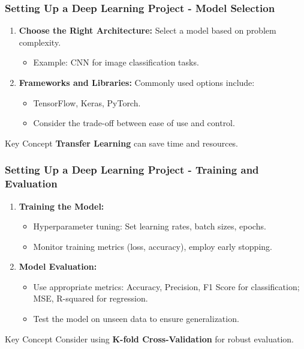 \documentclass[aspectratio=169]{beamer}
\begin{document}
\begin{frame}[fragile]
    \frametitle{Setting Up a Deep Learning Project - Model Selection}
    \begin{enumerate}
        \item \textbf{Choose the Right Architecture:} Select a model based on problem complexity.
            \begin{itemize}
                \item Example: CNN for image classification tasks.
            \end{itemize}
        \item \textbf{Frameworks and Libraries:} Commonly used options include:
            \begin{itemize}
                \item TensorFlow, Keras, PyTorch.
                \item Consider the trade-off between ease of use and control.
            \end{itemize}
    \end{enumerate}
    \begin{block}{Key Concept}
        \textbf{Transfer Learning} can save time and resources.
    \end{block}
\end{frame}

\begin{frame}[fragile]
    \frametitle{Setting Up a Deep Learning Project - Training and Evaluation}
    \begin{enumerate}
        \item \textbf{Training the Model:}
        \begin{itemize}
            \item Hyperparameter tuning: Set learning rates, batch sizes, epochs.
            \item Monitor training metrics (loss, accuracy), employ early stopping.
        \end{itemize}
        \item \textbf{Model Evaluation:}
        \begin{itemize}
            \item Use appropriate metrics: Accuracy, Precision, F1 Score for classification; MSE, R-squared for regression.
            \item Test the model on unseen data to ensure generalization.
        \end{itemize}
    \end{enumerate}
    \begin{block}{Key Concept}
        Consider using \textbf{K-fold Cross-Validation} for robust evaluation.
    \end{block}
\end{frame}
\end{document}
